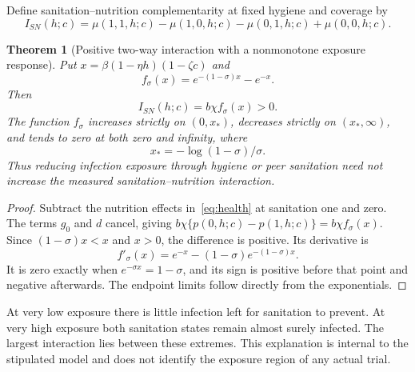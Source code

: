\documentclass[11pt,a4paper]{article}
\newtheorem{theorem}{Theorem}[section]
\theoremstyle{definition}
\theoremstyle{remark}
\begin{document}
Define sanitation--nutrition complementarity at fixed hygiene and coverage by
\[
 I_{SN}(h;c)=\mu(1,1,h;c)-\mu(1,0,h;c)
                         -\mu(0,1,h;c)+\mu(0,0,h;c).
\]

\begin{theorem}[Positive two-way interaction with a nonmonotone exposure response]\label{th:two}
Put $x=\beta(1-\eta h)(1-\zeta c)$ and
\[
 f_\sigma(x)=e^{-(1-\sigma)x}-e^{-x}.
\]
Then
\[
 I_{SN}(h;c)=b\chi f_\sigma(x)>0.
\]
The function $f_\sigma$ increases strictly on $(0,x_*)$, decreases strictly on $(x_*,\infty)$, and tends to zero at both zero and infinity, where
\[
 x_*=-\log(1-\sigma)/\sigma.
\]
Thus reducing infection exposure through hygiene or peer sanitation need not increase the measured sanitation--nutrition interaction.
\end{theorem}
\begin{proof}
Subtract the nutrition effects in~\eqref{eq:health} at sanitation one and zero. The terms $g_0$ and $d$ cancel, giving
$b\chi\{p(0,h;c)-p(1,h;c)\}=b\chi f_\sigma(x)$.
Since $(1-\sigma)x<x$ and $x>0$, the difference is positive. Its derivative is
\[
 f'_\sigma(x)=e^{-x}-(1-\sigma)e^{-(1-\sigma)x}.
\]
It is zero exactly when $e^{-\sigma x}=1-\sigma$, and its sign is positive before that point and negative afterwards. The endpoint limits follow directly from the exponentials.
\end{proof}

At very low exposure there is little infection left for sanitation to prevent. At very high exposure both sanitation states remain almost surely infected. The largest interaction lies between these extremes. This explanation is internal to the stipulated model and does not identify the exposure region of any actual trial.
\end{document}
